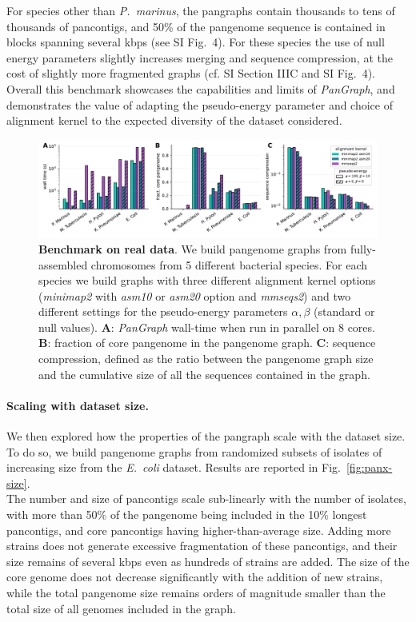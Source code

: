 \documentclass[aps,rmp,reprint,superscriptaddress,notitlepage,10pt]{revtex4-1}
\begin{document}
For species other than \textit{P.~marinus}, the pangraphs contain thousands to tens of thousands of pancontigs, and 50\% of the pangenome sequence is contained in blocks spanning several kbps (see SI Fig.~4).
For these species the use of null energy parameters slightly increases merging and sequence compression, at the cost of slightly more fragmented graphs (cf. SI Section IIIC and SI Fig.~4).
Overall this benchmark showcases the capabilities and limits of \textit{PanGraph}, and demonstrates the value of adapting the pseudo-energy parameter and choice of alignment kernel to the expected diversity of the dataset considered.


\begin{figure}[htb]
    \includegraphics[width=\textwidth]{figs/panx_benchmark.pdf}
    \caption{{\bf Benchmark on real data}.
        We build pangenome graphs from fully-assembled chromosomes from 5 different bacterial species. For each species we build graphs with three different alignment kernel options (\textit{minimap2} with \textit{asm10} or \textit{asm20} option and \textit{mmseqs2}) and two different settings for the pseudo-energy parameters $\alpha, \beta$ (standard or null values).
        \textbf{A}: \textit{PanGraph} wall-time when run in parallel on 8 cores.
        \textbf{B}: fraction of core pangenome in the pangenome graph.
        \textbf{C}: sequence compression, defined as the ratio between the pangenome graph size and the cumulative size of all the sequences contained in the graph.
    }
    \label{fig:panx-benchmark}
\end{figure}

\paragraph*{Scaling with dataset size.}

We then explored how the properties of the pangraph scale with the dataset size. To do so, we build pangenome graphs from randomized subsets of isolates of increasing size from the \textit{E.~coli} dataset. Results are reported in Fig.~\ref{fig:panx-size}.\\
The number and size of pancontigs scale sub-linearly with the number of isolates, with more than 50\% of the pangenome being included in the 10\% longest pancontigs, and core pancontigs having higher-than-average size. Adding more strains does not generate excessive fragmentation of these pancontigs, and their size remains of several kbps even as hundreds of strains are added. The size of the core genome does not decrease significantly with the addition of new strains, while the total pangenome size remains orders of magnitude smaller than the total size of all genomes included in the graph.
\end{document}
